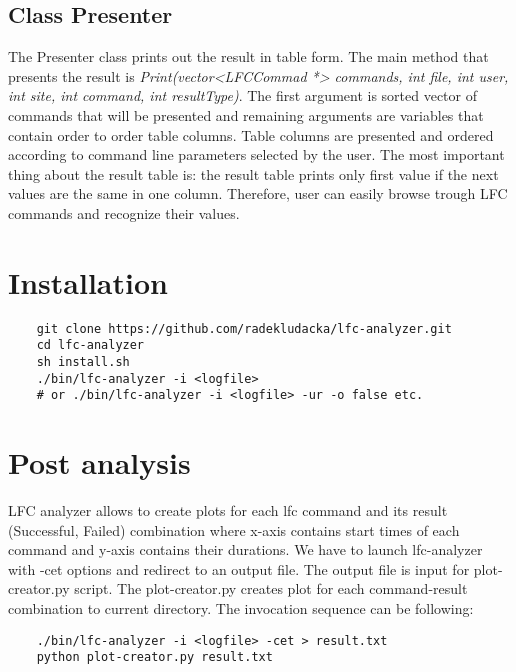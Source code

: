 \documentclass[a4paper, 11pt]{article} %
\begin{document}
\subsection{Class Presenter}
\label{c:presenter}

The Presenter class prints out the result in table form. The main method that presents the result is \textit{Print(vector<LFCCommad *> commands, int file, int user, int site, int command, int resultType)}. The first argument is sorted vector of commands that will be presented and remaining arguments are variables that contain order to order table columns. Table columns are presented and ordered according to command line parameters selected by the user. The most important thing about the result table is: the result table prints only first value if the next values are the same in one column. Therefore, user can easily browse trough LFC commands and recognize their values.


\section*{Installation}

\begin{verbatim}
    git clone https://github.com/radekludacka/lfc-analyzer.git
    cd lfc-analyzer
    sh install.sh
    ./bin/lfc-analyzer -i <logfile>
    # or ./bin/lfc-analyzer -i <logfile> -ur -o false etc.
\end{verbatim}

\section*{Post analysis}

LFC analyzer allows to create plots for each lfc command and its result (Successful, Failed) combination where x-axis contains 
start times of each command and y-axis contains their durations. We have to launch lfc-analyzer with -cet options and redirect
to an output file. The output file is input for plot-creator.py script. The plot-creator.py creates plot for each
command-result combination to current directory. The invocation sequence can be following:

\begin{verbatim}
    ./bin/lfc-analyzer -i <logfile> -cet > result.txt
    python plot-creator.py result.txt
\end{verbatim}
\end{document}
